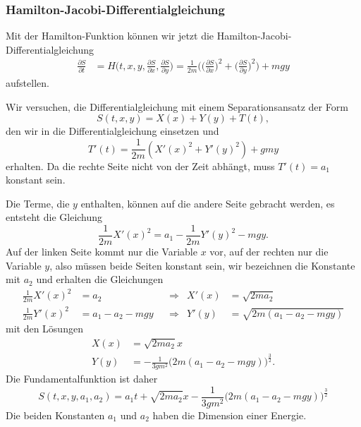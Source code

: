 %
%
\subsubsection{Hamilton-Jacobi-Differentialgleichung}
Mit der Hamilton-Funktion können wir jetzt die
Hamilton-Jacobi-Differentialgleichung 
%
\begin{align*}
\frac{\partial S}{\partial t}
&=
H\biggl(
t,x,y,\frac{\partial S}{\partial x},\frac{\partial S}{\partial y}
\biggr)
=
\frac1{2m}\biggl(
\biggl(\frac{\partial S}{\partial x}\biggr)^2
+
\biggl(\frac{\partial S}{\partial y}\biggr)^2
\biggr)
+
mgy
\end{align*}
aufstellen.

Wir versuchen, die Differentialgleichung mit einem Separationsansatz
%
der Form
\[
S(t,x,y)
=
X(x)
+
Y(y)
+
T(t),
\]
den wir in die Differentialgleichung einsetzen und
\[
T'(t)
=
\frac1{2m}(X'(x)^2 + Y'(y)^2)
+
gmy
\]
erhalten.
Da die rechte Seite nicht von der Zeit abhängt, muss $T'(t) = a_1$ konstant
sein.

Die Terme, die $y$ enthalten, können auf die andere Seite gebracht
werden, es entsteht die Gleichung
\[
\frac{1}{2m}X'(x)^2
=
a_1-\frac{1}{2m}Y'(y)^2 -mgy.
\]
Auf der linken Seite kommt nur die Variable $x$ vor, auf der rechten
nur die Variable $y$, also müssen beide Seiten konstant sein,
wir bezeichnen die Konstante mit $a_2$ und erhalten die Gleichungen
\begin{align*}
\frac1{2m}X'(x)^2&= a_2
&&\Rightarrow&
X'(x) &= \sqrt{2ma_2}
\\
\frac1{2m}Y'(x)^2&=a_1-a_2-mgy
&&\Rightarrow&
Y'(y) &= \sqrt{2m(a_1-a_2-mgy)}
\end{align*}
mit den Lösungen
\begin{align*}
X(x) &= \sqrt{2ma_2}x
\\
Y(y) &=
-\frac{1}{3gm^2}
\bigl(2m(a_1-a_2-mgy)\bigr)^{\frac32}.
\end{align*}
Die Fundamentalfunktion ist daher
\[
S(t,x,y,a_1,a_2)
=
a_1t
+
\sqrt{2ma_2}x
-
\frac{1}{3gm^2}
\bigl(2m(a_1-a_2-mgy)\bigr)^{\frac32}
\]
Die beiden Konstanten $a_1$ und $a_2$ haben die Dimension einer
Energie.

%
%
